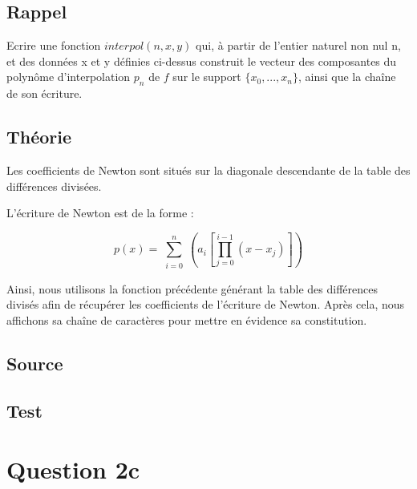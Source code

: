 \documentclass[a4paper,10pt]{report}
\begin{document}
\subsection*{Rappel}

Ecrire une fonction $interpol(n, x, y)$ qui, à partir de l’entier naturel non
nul n, et des données x et y définies ci-dessus construit le vecteur des
composantes du polynôme d’interpolation $p_{n}$ de $f$ sur le support $\lbrace  x_{0},...,x_{n} \rbrace$,
ainsi que la chaîne de son écriture.

\subsection*{Théorie}

Les coefficients de Newton sont situés sur la diagonale descendante de la table des différences divisées. 

L’écriture de Newton est de la forme :

\begin{equation}
p(x) = \sum_{\substack{i=0}}^{n} \left(a_{i}\left[\prod_{j=0}^{i-1}(x-x_{j})\right]\right)
\end{equation}

Ainsi, nous utilisons la fonction précédente générant la table des différences divisés afin de récupérer les coefficients de l’écriture de Newton. Après cela, nous affichons sa chaîne de caractères pour mettre en évidence sa constitution. 

\newpage
\subsection*{Source}

\begin{center}
	
\end{center}

\subsection*{Test}

\begin{center}
	
\end{center}

\section*{Question 2c}
\end{document}
